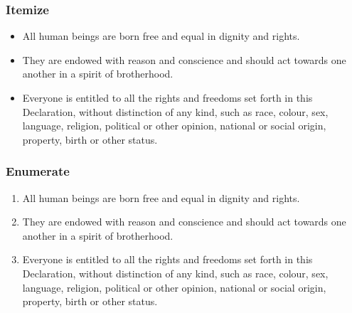 \documentclass[handout,aspectratio=169]{beamer}
\begin{document}

\begin{frame}
    \frametitle{Itemize}

    \begin{itemize}[<+->]

        \item All human beings are born free and equal in dignity and rights.

        \item They are endowed with reason and conscience and should act
            towards one another in a spirit of brotherhood.

        \item Everyone is entitled to all the rights and freedoms set forth in
            this Declaration, without distinction of any kind, such as race,
            colour, sex, language, religion, political or other opinion,
            national or social origin, property, birth or other status.

    \end{itemize}

\end{frame}


\begin{frame}
    \frametitle{Enumerate}

    \begin{enumerate}[<+->]

        \item All human beings are born free and equal in dignity and rights.

        \item They are endowed with reason and conscience and should act
            towards one another in a spirit of brotherhood.

        \item Everyone is entitled to all the rights and freedoms set forth in
            this Declaration, without distinction of any kind, such as race,
            colour, sex, language, religion, political or other opinion,
            national or social origin, property, birth or other status.

    \end{enumerate}

\end{frame}

\end{document}
